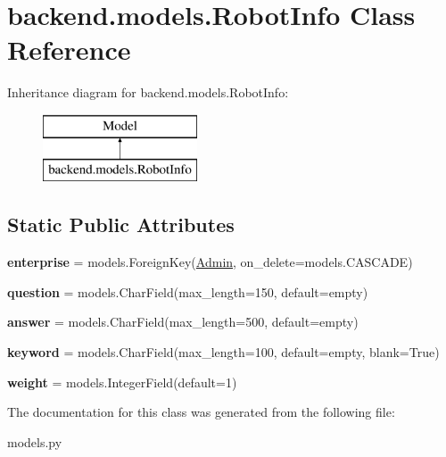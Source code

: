 \hypertarget{classbackend_1_1models_1_1_robot_info}{}\section{backend.\+models.\+Robot\+Info Class Reference}
\label{classbackend_1_1models_1_1_robot_info}
Inheritance diagram for backend.\+models.\+Robot\+Info\+:\begin{figure}[H]
\begin{center}
\leavevmode
\includegraphics[height=2.000000cm]{classbackend_1_1models_1_1_robot_info}
\end{center}
\end{figure}
\subsection*{Static Public Attributes}
\begin{DoxyCompactItemize}
\item 
\mbox{\label{classbackend_1_1models_1_1_robot_info_ad94ac4dccba02edbc9043cafa0e56688}} 
{\bfseries enterprise} = models.\+Foreign\+Key(\textquotesingle{}\hyperlink{classbackend_1_1models_1_1_admin}{Admin}\textquotesingle{}, on\+\_\+delete=models.\+C\+A\+S\+C\+A\+DE)
\item 
\mbox{\label{classbackend_1_1models_1_1_robot_info_a215162cb88ee5c0b6239568b019da392}} 
{\bfseries question} = models.\+Char\+Field(max\+\_\+length=150, default=\textquotesingle{}empty\textquotesingle{})
\item 
\mbox{\label{classbackend_1_1models_1_1_robot_info_a3ade5f91fe1db2885f17d459104e8d44}} 
{\bfseries answer} = models.\+Char\+Field(max\+\_\+length=500, default=\textquotesingle{}empty\textquotesingle{})
\item 
\mbox{\label{classbackend_1_1models_1_1_robot_info_aaed612185a4a357b374f3da4f2bb5a52}} 
{\bfseries keyword} = models.\+Char\+Field(max\+\_\+length=100, default=\textquotesingle{}empty\textquotesingle{}, blank=True)
\item 
\mbox{\label{classbackend_1_1models_1_1_robot_info_a4ad76dafa749231ae4f858cf243af26b}} 
{\bfseries weight} = models.\+Integer\+Field(default=1)
\end{DoxyCompactItemize}


The documentation for this class was generated from the following file\+:\begin{DoxyCompactItemize}
\item 
models.\+py\end{DoxyCompactItemize}
